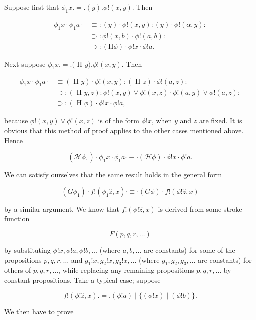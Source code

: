 \documentclass[10pt]{article}
\begin{document}
Suppose first that $\phi_{1} x .=.(y) . \phi!(x, y)$. Then

$$
\begin{aligned}
\phi_{1} x \cdot \phi_{1} a \cdot & \equiv:(y) \cdot \phi!(x, y):(y) \cdot \phi!(\alpha, y): \\
& \supset: \phi!(x, b) \cdot \phi!(a, b): \\
& \supset:(\mathrm{H} \phi) \cdot \phi!x \cdot \phi!a .
\end{aligned}
$$

Next suppose $\phi_{1} x .=.($ H $y) . \phi!(x, y)$. Then

$$
\begin{aligned}
\phi_{1} x \cdot \phi_{1} a \cdot & \equiv(\text { H } y) \cdot \phi!(x, y):(\text { H } z) \cdot \phi!(a, z): \\
& \supset:(\text { H } y, z): \phi!(x, y) \vee \phi!(x, z) \cdot \phi!(a, y) \vee \phi!(a, z): \\
& \supset:(\text { H } \phi) \cdot \phi!x \cdot \phi!a,
\end{aligned}
$$

because $\phi!(x, y) \vee \phi!(x, z)$ is of the form $\phi!x$, when $y$ and $z$ are fixed. It is obvious that this method of proof applies to the other cases mentioned above. Hence

$$
\left(\mathcal{H} \phi_{1}\right) \cdot \phi_{1} x \cdot \phi_{1} a \cdot \equiv \cdot(\mathcal{H} \phi) \cdot \phi!x \cdot \phi!a .
$$

We can satisfy ourselves that the same result holds in the general form

$$
\left(G \phi_{1}\right) \cdot f!\left(\phi_{1} \hat{z}, x\right) \cdot \equiv \cdot(G \phi) \cdot f!(\phi!\hat{z}, x)
$$

by a similar argument. We know that $f!(\phi!\hat{z}, x)$ is derived from some stroke-function

$$
F(p, q, r, \ldots)
$$

by substituting $\phi!x, \phi!a, \phi!b, \ldots$ (where $a, b, \ldots$ are constants) for some of the propositions $p, q, r, \ldots$ and $g_{1}!x, g_{2}!x, g_{3}!x, \ldots$ (where $g_{1}, g_{2}, g_{3}, \ldots$ are constants) for others of $p, q, r, \ldots$, while replacing any remaining propositions $p, q, r, \ldots$ by constant propositions. Take a typical case; suppose

$$
f!(\phi!\hat{z}, x) .=.(\phi!a) \mid\{(\phi!x) \mid(\phi!b)\} .
$$

We then have to prove
\end{document}

